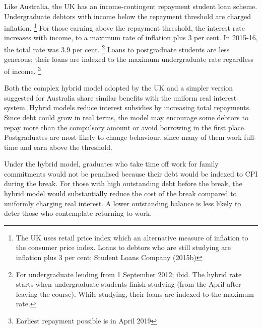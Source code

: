 \documentclass[embargoed]{grattan}
\begin{document}
Like Australia, the UK has an income-contingent repayment student loan scheme.
Undergraduate debtors with income below the repayment threshold are charged inflation.%
\footnote{The UK uses retail price index which an alternative measure of inflation to the consumer price index.
Loans to debtors who are still studying are inflation plus 3 per cent; Student Loans Company (2015b)} For those earning above the repayment threshold, the interest rate increases with income, to a maximum rate of inflation plus 3 per cent.
In 2015-16, the total rate was 3.9 per cent.%
\footnote{For undergraduate lending from 1 September 2012; ibid.
The hybrid rate starts when undergraduate students finish studying (from the April after leaving the course).
While studying, their loans are indexed to the maximum rate.} Loans to postgraduate students are less generous; their loans are indexed to the maximum undergraduate rate regardless of income.%
\footnote{Earliest repayment possible is in April 2019}

Both the complex hybrid model adopted by the UK and a simpler version suggested for Australia share similar benefits with the uniform real interest system.
Hybrid models reduce interest subsidies by increasing total repayments.
Since debt could grow in real terms, the model may encourage some debtors to repay more than the compulsory amount or avoid borrowing in the first place.
Postgraduates are most likely to change behaviour, since many of them work full-time and earn above the threshold.

Under the hybrid model, graduates who take time off work for family commitments would not be penalised because their debt would be indexed to \gls{CPI} during the break.
For those with high outstanding debt before the break, the hybrid model would substantially reduce the cost of the break compared to uniformly charging real interest.
A lower outstanding balance is less likely to deter those who contemplate returning to work.
\end{document}
